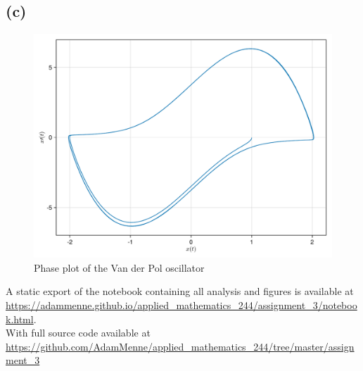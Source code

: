 \documentclass[a4paper, british]{article}
\begin{document}
\subsection*{(c)}

\begin{figure}[H]
    \centering
    \includegraphics[width=\textwidth]{figures/f4_2.pdf}
    \caption{Phase plot of the Van der Pol oscillator}
    \label{fig:4_2}
\end{figure}

A static export of the notebook containing all analysis and figures is available at \url{https://adammenne.github.io/applied_mathematics_244/assignment_3/notebook.html}.\\ 
With full source code available at \url{https://github.com/AdamMenne/applied_mathematics_244/tree/master/assignment_3}
\end{document}
